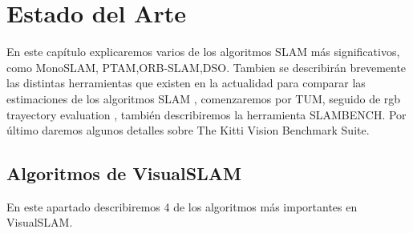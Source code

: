 \chapter{Estado del Arte} \label{cap:Estado del Arte} %

En este capítulo explicaremos varios de los algoritmos SLAM más significativos, como MonoSLAM, PTAM,ORB-SLAM,DSO.
Tambien se describirán brevemente las distintas herramientas que existen en la actualidad para comparar las estimaciones de los algoritmos SLAM , comenzaremos por TUM, seguido de rgb trayectory evaluation , también describiremos la herramienta SLAMBENCH.
Por último daremos algunos detalles sobre The Kitti Vision Benchmark Suite.

\section{Algoritmos de VisualSLAM}

En este apartado describiremos 4 de los algoritmos más importantes en VisualSLAM.


